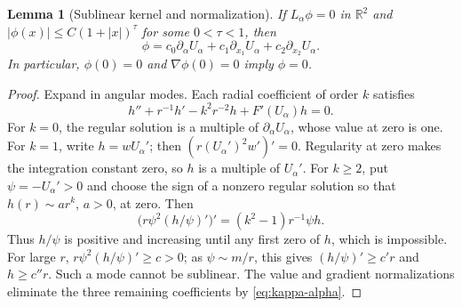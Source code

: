 \documentclass[11pt,reqno]{amsart}
\numberwithin{equation}{section}
\newtheorem{lemma}[theorem]{Lemma}
\theoremstyle{definition}
\theoremstyle{remark}
\newcommand{\R}{\mathbb R}
\begin{document}
\begin{lemma}[Sublinear kernel and normalization]
\label{thm:linearized-classification}
If $L_\alpha\phi=0$ in $\R^2$ and
$|\phi(x)|\le C(1+|x|)^\tau$ for some $0<\tau<1$, then
\begin{equation}\label{eq:kernel-classification}
 \phi=c_0\partial_\alpha U_\alpha
       +c_1\partial_{x_1}U_\alpha+c_2\partial_{x_2}U_\alpha.
\end{equation}
In particular, $\phi(0)=0$ and $\nabla\phi(0)=0$ imply $\phi=0$.
\end{lemma}
\begin{proof}
Expand in angular modes. Each radial coefficient of order $k$ satisfies
\begin{equation}\label{eq:mode-equation}
 h''+r^{-1}h'-k^2r^{-2}h+F'(U_\alpha)h=0.
\end{equation}
For $k=0$, the regular solution is a multiple of
$\partial_\alpha U_\alpha$, whose value at zero is one.
For $k=1$, write $h=wU_\alpha'$; then
$(r(U_\alpha')^2w')'=0$. Regularity at zero makes the integration
constant zero, so $h$ is a multiple of $U_\alpha'$.
For $k\ge2$, put $\psi=-U_\alpha'>0$ and choose the sign of a nonzero
regular solution so that $h(r)\sim a r^k$, $a>0$, at zero. Then
\begin{equation}\label{eq:higher-mode-comparison}
 \bigl(r\psi^2(h/\psi)'\bigr)'=(k^2-1)r^{-1}\psi h.
\end{equation}
Thus $h/\psi$ is positive and increasing until any first zero of $h$,
which is impossible. For large $r$, $r\psi^2(h/\psi)'\ge c>0$;
as $\psi\sim m/r$, this gives $(h/\psi)'\ge c'r$ and $h\ge c''r$.
Such a mode cannot be sublinear.
The value and gradient normalizations eliminate the three remaining
coefficients by \eqref{eq:kappa-alpha}.
\end{proof}
\end{document}
